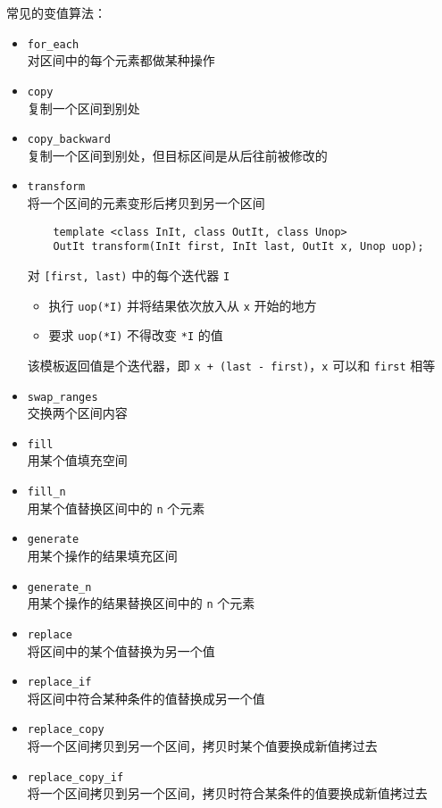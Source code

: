 \documentclass[UTF8]{ctexart}
\begin{document}
常见的变值算法：
\begin{itemize}
    \item \texttt{for\_each} \\
    对区间中的每个元素都做某种操作
    \item \texttt{copy} \\
    复制一个区间到别处
    \item \texttt{copy\_backward} \\
    复制一个区间到别处，但目标区间是从后往前被修改的
    \item \texttt{transform} \\
    将一个区间的元素变形后拷贝到另一个区间
    \begin{verbatim}
    template <class InIt, class OutIt, class Unop>
    OutIt transform(InIt first, InIt last, OutIt x, Unop uop);
    \end{verbatim}
    对 \texttt{[first, last)} 中的每个迭代器 \texttt{I}
    \begin{itemize}
        \item 执行 \texttt{uop(*I)} 并将结果依次放入从 \texttt{x} 开始的地方
        \item 要求 \texttt{uop(*I)} 不得改变 \texttt{*I} 的值
    \end{itemize}
    该模板返回值是个迭代器，即 \texttt{x + (last - first)}，\texttt{x} 可以和 \texttt{first} 相等
    \item \texttt{swap\_ranges} \\
    交换两个区间内容
    \item \texttt{fill} \\
    用某个值填充空间
    \item \texttt{fill\_n} \\
    用某个值替换区间中的 \texttt{n} 个元素
    \item \texttt{generate} \\
    用某个操作的结果填充区间
    \item \texttt{generate\_n} \\
    用某个操作的结果替换区间中的 \texttt{n} 个元素
    \item \texttt{replace} \\
    将区间中的某个值替换为另一个值
    \item \texttt{replace\_if} \\
    将区间中符合某种条件的值替换成另一个值
    \item \texttt{replace\_copy} \\
    将一个区间拷贝到另一个区间，拷贝时某个值要换成新值拷过去
    \item \texttt{replace\_copy\_if} \\
    将一个区间拷贝到另一个区间，拷贝时符合某条件的值要换成新值拷过去
\end{itemize}
\end{document}

